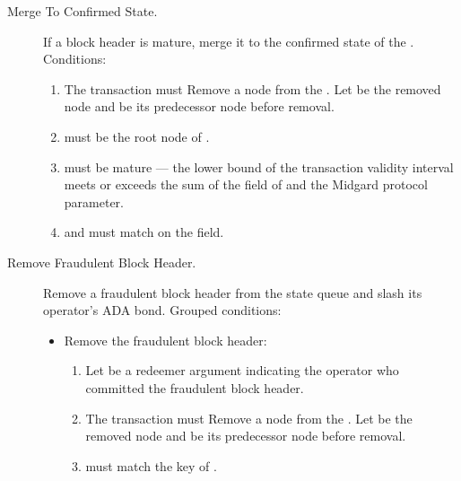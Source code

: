\documentclass[../midgard.tex]{subfiles}
\begin{document}
\begin{description}
    \item[Merge To Confirmed State.] If a block header is mature, merge it to the confirmed state of the . Conditions:
    \begin{enumerate}
        \item The transaction must Remove a node from the . Let  be the removed node and  be its predecessor node before removal.
        \item {} must be the root node of .
        \item {} must be mature --- the lower bound of the transaction validity interval meets or exceeds the sum of the  field of  and the Midgard  protocol parameter.
        \item {} and  must match on the  field.
    \end{enumerate}

    \item[Remove Fraudulent Block Header.] Remove a fraudulent block header from the state queue and slash its operator's ADA bond. Grouped conditions:
    \begin{itemize}
        \item Remove the fraudulent block header:
        \begin{enumerate}
            \item Let  be a redeemer argument indicating the operator who committed the fraudulent block header.
            \item The transaction must Remove a node from the . Let  be the removed node and  be its predecessor node before removal.
            \item {} must match the key of .
        \end{enumerate}


\end{itemize}
\end{description}
\end{document}
